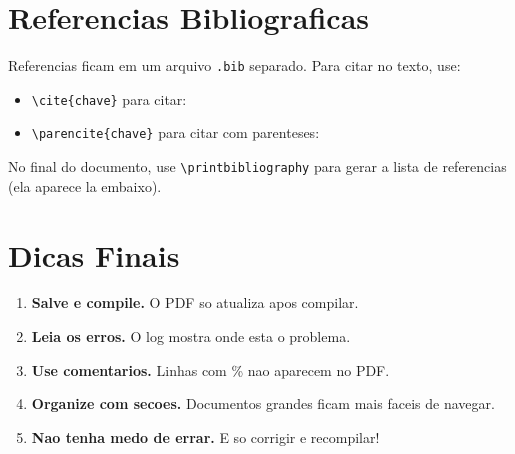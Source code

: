 \section{Referencias Bibliograficas}

Referencias ficam em um arquivo \texttt{.bib} separado.
Para citar no texto, use:

\begin{itemize}
    \item \verb|\cite{chave}| para citar: \cite{knuth1984}
    \item \verb|\parencite{chave}| para citar com parenteses: \parencite{lamport1994}
\end{itemize}

No final do documento, use \verb|\printbibliography| para
gerar a lista de referencias (ela aparece la embaixo).


\section{Dicas Finais}

\begin{enumerate}
    \item \textbf{Salve e compile.} O PDF so atualiza apos compilar.
    \item \textbf{Leia os erros.} O log mostra onde esta o problema.
    \item \textbf{Use comentarios.} Linhas com \% nao aparecem no PDF.
    \item \textbf{Organize com secoes.} Documentos grandes ficam mais faceis de navegar.
    \item \textbf{Nao tenha medo de errar.} E so corrigir e recompilar!
\end{enumerate}

\printbibliography


